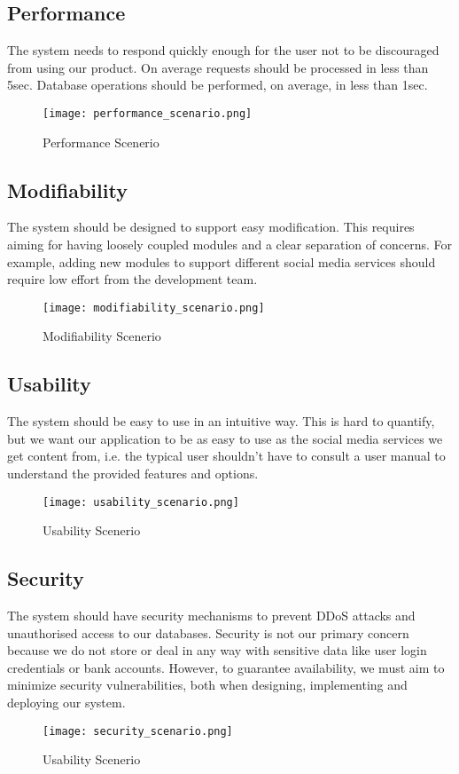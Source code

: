 \subsection{Performance}
The system needs to respond quickly enough for the user not to be discouraged
from using our product. On average requests should be processed in less than
5sec. Database operations should be performed, on average, in less than 1sec.
\begin{figure}[ht]
  \centering
  \texttt{[image: performance\_scenario.png]}
  \caption{Performance Scenerio}
\end{figure}

\subsection{Modifiability}
The system should be designed to support easy modification. This requires aiming
for having loosely coupled modules and a clear separation of concerns. For
example, adding new modules to support different social media services should
require low effort from the development team.
\begin{figure}[ht]
  \centering
  \texttt{[image: modifiability\_scenario.png]}
  \caption{Modifiability Scenerio}
\end{figure}

\newpage

\subsection{Usability}
The system should be easy to use in an intuitive way. This is hard to quantify,
but we want our application to be as easy to use as the social media services we
get content from, i.e. the typical user shouldn't have to consult a user manual
to understand the provided features and options.
\begin{figure}[ht]
  \centering
  \texttt{[image: usability\_scenario.png]}
  \caption{Usability Scenerio}
\end{figure}

\subsection{Security}
The system should have security mechanisms to prevent DDoS attacks and
unauthorised access to our databases. Security is not our primary concern
because we do not store or deal in any way with sensitive data like user login
credentials or bank accounts. However, to guarantee availability, we must aim to
minimize security vulnerabilities, both when designing, implementing and
deploying our system.
\begin{figure}[ht]
  \centering
  \texttt{[image: security\_scenario.png]}
  \caption{Usability Scenerio}
\end{figure}

